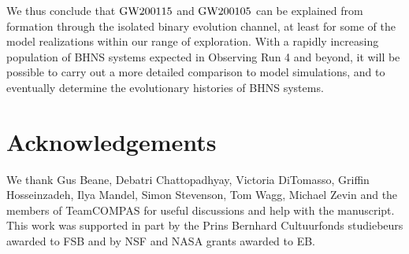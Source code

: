 \documentclass{aastex63}
\newcommand{\gwone}{\ensuremath{\rm{GW200115}}\xspace}
\newcommand{\gwzero}{\ensuremath{\rm{GW200105}}\xspace}
\begin{document}
We thus conclude that \gwone and \gwzero can be explained from formation through the isolated binary evolution channel, at least for some of the model realizations within our range of exploration.  With a rapidly increasing population of \ac{BHNS} systems expected in Observing Run 4 and beyond, it will be possible to carry out a more detailed comparison to model simulations, and to eventually determine the evolutionary histories of \ac{BHNS} systems.


\section*{Acknowledgements}

We thank Gus Beane, Debatri Chattopadhyay, Victoria DiTomasso, Griffin Hosseinzadeh,  Ilya Mandel, Simon Stevenson, Tom Wagg, Michael Zevin and the members of TeamCOMPAS for useful discussions and help with the manuscript. This work was supported in part by the Prins Bernhard Cultuurfonds studiebeurs awarded to FSB and by NSF and NASA grants awarded to EB. 
 





%
%
\end{document}
